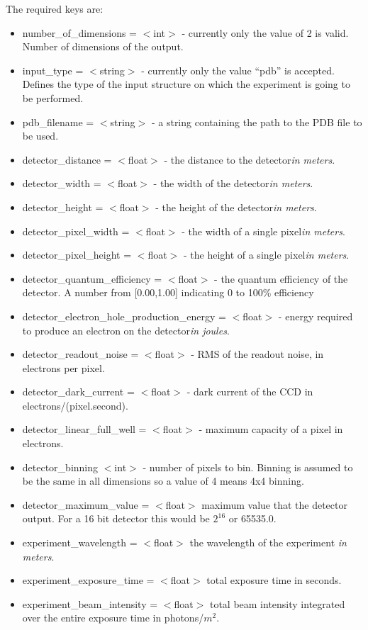 \documentclass{report}
\begin{document}
The required keys are:
\begin{itemize}
\item number\_of\_dimensions =  $<$int$>$ - currently only the value of 2 is valid. 
  Number of dimensions of the output.
\item input\_type = $<$string$>$ - currently only the value ``pdb'' is accepted. 
  Defines the type of the input structure on which the experiment is going to be performed.
\item pdb\_filename = $<$string$>$ - a string containing the path to the PDB file to be used.
\item detector\_distance = $<$float$>$ - the distance to the detector{\em in meters}.
\item detector\_width = $<$float$>$ - the width of the detector{\em in meters}.
\item detector\_height = $<$float$>$ - the height of the detector{\em in meters}.
\item detector\_pixel\_width = $<$float$>$ - the width of a single pixel{\em in meters}.
\item detector\_pixel\_height = $<$float$>$ - the height of a single pixel{\em in meters}.
\item detector\_quantum\_efficiency = $<$float$>$ - the quantum efficiency of the detector. 
  A number from [0.00,1.00] indicating 0 to 100\% efficiency
\item detector\_electron\_hole\_production\_energy = $<$float$>$ - energy required to produce an electron on the detector{\em in joules}.
\item detector\_readout\_noise = $<$float$>$ - RMS of the readout noise, in electrons per pixel.
\item detector\_dark\_current = $<$float$>$ - dark current of the CCD in electrons/(pixel.second).
\item detector\_linear\_full\_well = $<$float$>$ - maximum capacity of a pixel in electrons.
\item detector\_binning $<$int$>$ - number of pixels to bin. Binning is assumed to be the same in all dimensions
  so a value of 4 means 4x4 binning.
\item detector\_maximum\_value = $<$float$>$ maximum value that the detector output. For a 16 bit detector this would be $2^{16}$ or 65535.0.
\item experiment\_wavelength = $<$float$>$ the wavelength of the experiment {\em in meters}.
\item experiment\_exposure\_time = $<$float$>$ total exposure time in seconds.
\item experiment\_beam\_intensity = $<$float$>$ total beam intensity integrated over the entire exposure time in photons/$m^2$.
\end{itemize}
\end{document}
